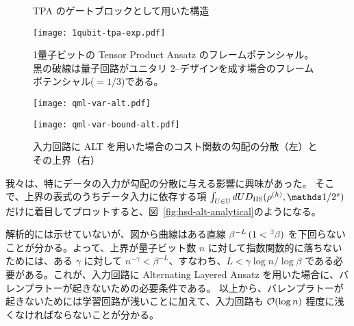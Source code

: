\begin{figure}[H]
    \centering
    \caption{TPA のゲートブロックとして用いた構造}
    \label{fig:tpa-example}
\end{figure}

\begin{figure}[H]
    \centering
    \texttt{[image: 1qubit-tpa-exp.pdf]}
    \caption{1量子ビットの Tensor Product Ansatz のフレームポテンシャル。黒の破線は量子回路がユニタリ $2$--デザインを成す場合のフレームポテンシャル($=1/3$)である。}
    \label{fig:1qubit-tpa-exp}
\end{figure}


\begin{figure}[H]
    \begin{minipage}[b]{0.5\columnwidth}
        \centering
        \texttt{[image: qml-var-alt.pdf]}
    \end{minipage}
    \hspace{0\columnwidth}
    \begin{minipage}[b]{0.5\columnwidth}
        \centering
        \texttt{[image: qml-var-bound-alt.pdf]}
    \end{minipage}
    \caption{入力回路に ALT を用いた場合のコスト関数の勾配の分散（左）とその上界（右）}
    \label{fig:qml-var-alt}
\end{figure}

我々は、特にデータの入力が勾配の分散に与える影響に興味があった。
そこで、上界の表式のうちデータ入力に依存する項 $\int_{U\in\bbU} dU D_{\HS} (\rho^{(h)} , \bbid/2^s)$ だけに着目してプロットすると、図~\ref{fig:hsd-alt-analytical}のようになる。  

解析的には示せていないが、図から曲線はある直線 $\beta^{-L}\,(1 < {}^\exists\beta)$ を下回らないことが分かる。よって、上界が量子ビット数 $n$ に対して指数関数的に落ちないためには、ある $\gamma$ に対して $n^{-\gamma} < \beta^{-L}$、すなわち、$L < \gamma\log{n}/\log\beta$ である必要がある。これが、入力回路に Alternating Layered Ansatz を用いた場合に、バレンプラトーが起きないための必要条件である。
以上から、バレンプラトーが起きないためには学習回路が浅いことに加えて、入力回路も $\order{\log{n}}$ 程度に浅くなければならないことが分かる。

